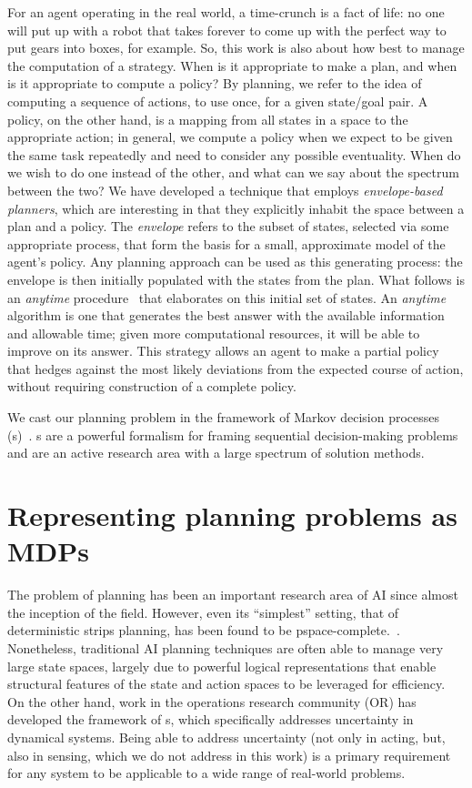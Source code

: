 For an agent operating in the real world, a time-crunch is a fact of
life: no one will put up with a robot that takes forever to come up
with the perfect way to put gears into boxes, for example.  So, this
work is also about how best to manage the computation of a strategy.
When is it appropriate to make a plan, and when is it appropriate to
compute a policy?  By planning, we refer to the idea of computing a
sequence of actions, to use once, for a given state/goal pair.  A
policy, on the other hand, is a mapping from all states in a space to
the appropriate action; in general, we compute a policy when we expect
to be given the same task repeatedly and need to consider any possible
eventuality. When do we wish to do one instead of the other, and what
can we say about the spectrum between the two?  We have developed a
technique that employs \emph{envelope-based planners}, which are
interesting in that they explicitly inhabit the space between a plan
and a policy.  The \emph{envelope} refers to the subset of states,
selected via some appropriate process, that form the basis for a
small, approximate model of the agent's policy.  Any planning approach
can be used as this generating process: the envelope is then initially
populated with the states from the plan.  What follows is an
\emph{anytime} procedure~\cite{dean88} that elaborates on this initial
set of states.  An \emph{anytime} algorithm is one that generates the
best answer with the available information and allowable time; given
more computational resources, it will be able to improve on its
answer.  This strategy allows an agent to make a partial policy that
hedges against the most likely deviations from the expected course of
action, without requiring construction of a complete policy.


We cast our planning problem in the framework of Markov decision
processes (\mdp s)~\cite{puterman94book}.  \mdp s are a powerful
formalism for framing sequential decision-making problems and are an
active research area with a large spectrum of solution methods.  


\section{Representing planning problems as MDPs}


The problem of planning has been an important research area of AI
since almost the inception of the field.  However, even its
``simplest'' setting, that of deterministic {\sc strips} planning, has
been found to be {\sc pspace}-complete.~\cite{bylander94}.
Nonetheless, traditional AI planning techniques are often able to
manage very large state spaces, largely due to powerful logical
representations that enable structural features of the state and
action spaces to be leveraged for efficiency.  On the other hand, work
in the operations research community (OR) has developed the framework
of \mdp s, which specifically addresses uncertainty in dynamical
systems.  Being able to address uncertainty (not only in acting, but,
also in sensing, which we do not address in this work) is a primary
requirement for any system to be applicable to a wide range of
real-world problems.

